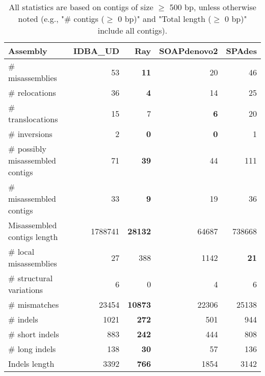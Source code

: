 \documentclass[12pt,a4paper]{article}
\begin{document}
\begin{table}[ht]
\begin{center}
\caption{All statistics are based on contigs of size $\geq$ 500 bp, unless otherwise noted (e.g., "\# contigs ($\geq$ 0 bp)" and "Total length ($\geq$ 0 bp)" include all contigs).}
\begin{tabular}{|l*{4}{|r}|}
\hline
Assembly & IDBA\_UD & Ray & SOAPdenovo2 & SPAdes \\ \hline
\# misassemblies & 53 & {\bf 11} & 20 & 46 \\ \hline
\hspace{5mm}\# relocations & 36 & {\bf 4} & 14 & 25 \\ \hline
\hspace{5mm}\# translocations & 15 & 7 & {\bf 6} & 20 \\ \hline
\hspace{5mm}\# inversions & 2 & {\bf 0} & {\bf 0} & 1 \\ \hline
\# possibly misassembled contigs & 71 & {\bf 39} & 44 & 111 \\ \hline
\# misassembled contigs & 33 & {\bf 9} & 19 & 36 \\ \hline
Misassembled contigs length & 1788741 & {\bf 28132} & 64687 & 738668 \\ \hline
\# local misassemblies & 27 & 388 & 1142 & {\bf 21} \\ \hline
\# structural variations & 6 & 0 & 4 & 6 \\ \hline
\# mismatches & 23454 & {\bf 10873} & 22306 & 25138 \\ \hline
\# indels & 1021 & {\bf 272} & 501 & 944 \\ \hline
\hspace{5mm}\# short indels & 883 & {\bf 242} & 444 & 808 \\ \hline
\hspace{5mm}\# long indels & 138 & {\bf 30} & 57 & 136 \\ \hline
Indels length & 3392 & {\bf 766} & 1854 & 3142 \\ \hline
\end{tabular}
\end{center}
\end{table}
\end{document}

